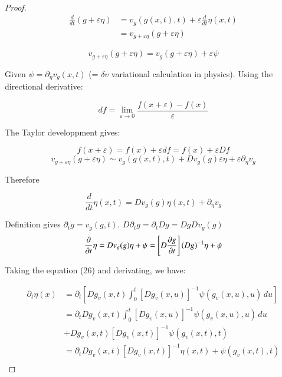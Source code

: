 \documentclass[final, paper=letter,5p,times,twocolumn]{elsarticle}
\theoremstyle{definition}
\begin{document}
\begin{proof}
  \begin{equation}
    \begin{split}
      \frac{d}{dt} (g+\varepsilon \eta) & =  v_{g}(g(x,t),t) + \varepsilon \frac{d}{dt} \eta(x,t) \\
      & = v_{g+\varepsilon \eta}(g+\varepsilon \eta)
    \end{split}
  \end{equation}

  $$
  v_{g+\varepsilon \eta}(g+\varepsilon \eta) = v_{g}(g+\varepsilon \eta) + \varepsilon \psi
  $$

  Given $\psi = \partial_{\eta} v_{g} (x,t)$ (= $\delta v$ variational calculation in physics). Using the directional derivative:

  $$
  df = \underset{\varepsilon \rightarrow 0}{\lim} \frac{f(x + \varepsilon) - f(x)}{\varepsilon}
  $$

  The Taylor developpment gives:

  $$
  f(x + \varepsilon) = f(x) + \varepsilon df = f(x) + \varepsilon Df
  $$
  $$
  v_{g+\varepsilon \eta}(g+\varepsilon \eta) \sim v_{g}(g(x,t),t) + D v_{g}(g) \varepsilon \eta + \varepsilon \partial_{\eta} v_{g}
  $$
  
Therefore 

  $$
  \frac{d}{dt} \eta(x,t) = Dv_{g}(g) \eta(x,t) + \partial_{\eta} v_{g}
  $$


  Definition gives $\partial_{t} g = v_{g}(g,t)$. $D \partial_{t} g = \partial_{t} Dg = Dg Dv_{g}(g)$
  $$
  \frac{\partial}{\partial t} \eta = D v_{g} (g) \eta + \psi\\
  = \left[ D \frac{\partial g}{\partial t} \right](Dg)^{-1} \eta + \psi
  $$

  Taking the equation (26) and derivating, we have:

  \begin{equation*}
    \begin{split}
    \partial_{t} \eta(x) & = \partial_{t} \left[ D g_{v}(x,t) \int_{0}^{t} \left[ Dg_{v}(x,u) \right]^{-1} \psi(g_{v}(x,u), u) \, du \right]\\
    & = \partial_{t}D g_{v}(x,t) \int_{0}^{t} \left[ Dg_{v}(x,u) \right]^{-1} \psi(g_{v}(x,u), u) \, du  \\
    & + D g_{v}(x,t) \left[ Dg_{v}(x,t) \right]^{-1} \psi(g_{v}(x,t), t) \\
    & = \partial_{t}D g_{v}(x,t) \left[ Dg_{v}(x,t) \right]^{-1} \eta(x,t) + \psi(g_{v}(x,t), t) \\
    \end{split}
  \end{equation*}

   
\end{proof}
\end{document}
